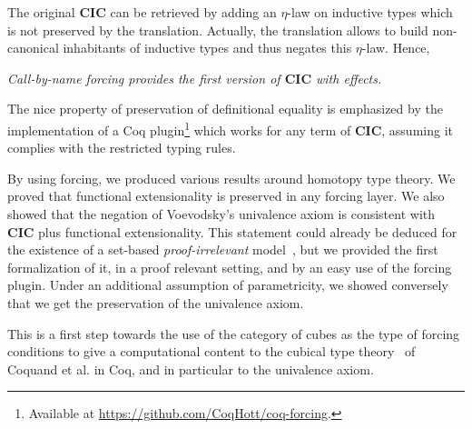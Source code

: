 \documentclass{easychair}
\newcommand{\cic}{\mathbf{CIC}}
\begin{document}
  The original $\cic$ can be retrieved by adding an $\eta$-law on inductive types which is not preserved by the translation. Actually, the translation allows to build non-canonical inhabitants of inductive types and thus negates this $\eta$-law. Hence,
  \begin{center}
    \emph{{Call-by-name forcing provides the first version of $\cic$ with effects.}}
  \end{center}
  The nice property of preservation of definitional equality is emphasized by the implementation of a Coq plugin\footnote{Available at \url{https://github.com/CoqHott/coq-forcing}.} which works for any term of $\cic$, assuming it complies with the restricted typing rules. 
  \par
  By using forcing, we produced various results around homotopy type theory. We proved that functional extensionality is preserved in any forcing layer. We also showed that the negation of Voevodsky's univalence axiom is consistent with $\cic$ plus functional extensionality. 
  This statement could already be deduced for the existence of a set-based \emph{proof-irrelevant} model~\cite{Werner97}, but we provided the first formalization of it, in a proof relevant setting, and by an easy use of the forcing plugin. Under an additional assumption of parametricity, we showed conversely that we get the preservation of the univalence axiom.

  This is a first step towards the use of the category of cubes as the
  type of forcing conditions to give a computational content to the cubical
  type theory~\cite{cubicaltt} of Coquand et al. in Coq, and in particular to
  the univalence axiom.



\end{document}
